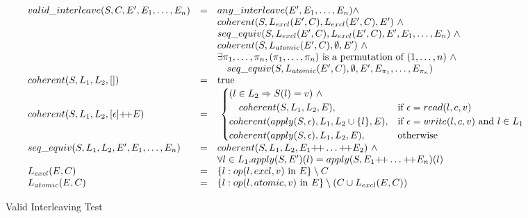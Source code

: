 \begin{figure*}
$$
\begin{array}{lll}
valid\_interleave(S, C, E', {E}_1,\ldots,{E}_n) & = & any\_interleave(E', {E}_1,\ldots,{E}_n) \wedge \\
& & coherent(S, L_{excl}(E', C), L_{excl}(E', C), E')\ \wedge \\
& & seq\_equiv(S, L_{excl}(E', C), L_{excl}(E', C), E', {E}_1,\ldots,{E}_n)\ \wedge \\
& & coherent(S, L_{atomic}(E', C), \emptyset, E')\ \wedge \\
& & \exists {\pi}_1,\ldots,{\pi}_n, ({\pi}_1,\ldots,{\pi}_n) \text{ is a permutation of } (1,\ldots,n)\ \wedge \\
& & \ \ \ seq\_equiv(S, L_{atomic}(E', C), \emptyset, E', E_{\pi_1}, \ldots, E_{\pi_n}) \\
coherent(S, L_1, L_2, []) & = & \text{true} \\
coherent(S, L_1, L_2, [ \epsilon ] \text{+\!+} E) & = &\
\begin{cases}
(l \in L_2 \Rightarrow S(l) = v)\ \wedge \\
\ \ \ coherent(S, L_1, L_2, E), & \text{if $\epsilon = read(l, c, v)$} \\
coherent(apply(S, \epsilon), L_1, L_2 \cup \{ l \}, E), & \text{if $\epsilon = write(l, c, v)$ and $l \in L_1$} \\
coherent(apply(S, \epsilon), L_1, L_2, E), & \text{otherwise}
\end{cases} \\
seq\_equiv(S, L_1, L_2, E', {E}_1,\ldots,{E}_n) & = & coherent(S, L_1, L_2, E_1 \text{+\!+} \ldots \text{+\!+} E_2)\ \wedge \\
& & \forall l \in L_1. apply(S, E')(l) = apply(S, E_1 \text{+\!+} \ldots \text{+\!+} E_n)(l) \\
L_{excl}(E, C) & = & \{ l : op(l, excl, v) \text{ in } E  \} \setminus C \\
L_{atomic}(E, C) & = & \{ l : op(l, atomic, v) \text{ in } E \} \setminus (C \cup L_{excl}(E, C)) \\
\end{array}
$$
\caption{Valid Interleaving Test}
\label{fig:validinterleave}
\vspace{-5mm}
\end{figure*}

